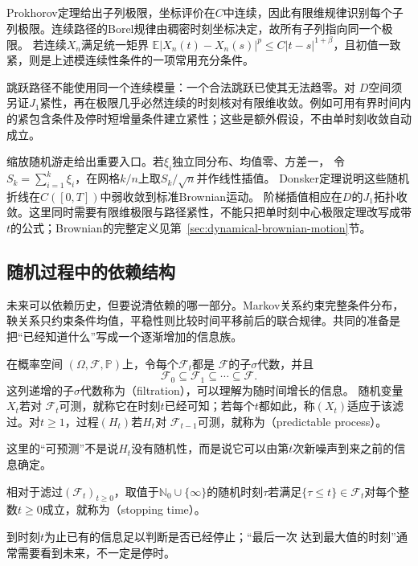Prokhorov定理给出子列极限，坐标评价在\(C\)中连续，因此有限维规律识别每个子列极限。连续路径的Borel规律由稠密时刻坐标决定，故所有子列指向同一个极限。
若连续\(X_n\)满足统一矩界
\(\mathbb E|X_n(t)-X_n(s)|^p\leq C|t-s|^{1+\beta}\)，且初值一致紧，则是上述模连续性条件的一项常用充分条件。

跳跃路径不能使用同一个连续模量：一个合法跳跃已使其无法趋零。对
\(D\)空间须另证\(J_1\)紧性，再在极限几乎必然连续的时刻核对有限维收敛。例如可用有界时间内的紧包含条件及停时短增量条件建立紧性；这些是额外假设，不由单时刻收敛自动成立。

缩放随机游走给出重要入口。若\(\xi_i\)独立同分布、均值零、方差一，
令\(S_k=\sum_{i=1}^k\xi_i\)，在网格\(k/n\)上取\(S_k/\sqrt n\)并作线性插值。
Donsker定理说明这些随机折线在\(C([0,T])\)中弱收敛到标准Brownian运动。
阶梯插值相应在\(D\)的\(J_1\)拓扑收敛。这里同时需要有限维极限与路径紧性，不能只把单时刻中心极限定理改写成带\(t\)的公式；Brownian的完整定义见第~\ref{sec:dynamical-brownian-motion}节。

\subsection{随机过程中的依赖结构}
\label{sec:stoch-martingales-stopping-sequential-concentration}
未来可以依赖历史，但要说清依赖的哪一部分。Markov关系约束完整条件分布，鞅关系只约束条件均值，平稳性则比较时间平移前后的联合规律。共同的准备是把“已经知道什么”写成一个逐渐增加的信息族。
\begin{definition}[滤过、适应与可预测性]
  \label{def:stoch-filtration-adaptation-predictability}
在概率空间
$(\Omega,\mathcal{F},\mathbb{P})$上，令每个$\mathcal{F}_t$都是
$\mathcal{F}$的子$\sigma$代数，并且
\[
  \mathcal{F}_0\subseteq\mathcal{F}_1\subseteq\cdots\subseteq\mathcal{F}.
\]
这列递增的子$\sigma$代数称为（filtration），可以理解为随时间增长的信息。
随机变量$X_t$若对
$\mathcal{F}_t$可测，就称它在时刻$t$已经可知；若每个$t$都如此，称$(X_t)$适应于该滤过。对$t\geq1$，过程$(H_t)$若$H_t$对
$\mathcal{F}_{t-1}$可测，就称为（predictable process）。
\end{definition}
这里的“可预测”不是说$H_t$没有随机性，而是说它可以由第$t$次新噪声到来之前的信息确定。
\begin{definition}[停时]
  \label{def:stoch-stopping-time}
  相对于滤过\((\mathcal F_t)_{t\geq0}\)，取值于\(\mathbb N_0\cup\{\infty\}\)的随机时刻$\tau$若满足$\{\tau\leq t\}\in\mathcal{F}_t$对每个整数$t\geq0$成立，就称为（stopping time）。
\end{definition}
到时刻$t$为止已有的信息足以判断是否已经停止；“最后一次
达到最大值的时刻”通常需要看到未来，不一定是停时。


